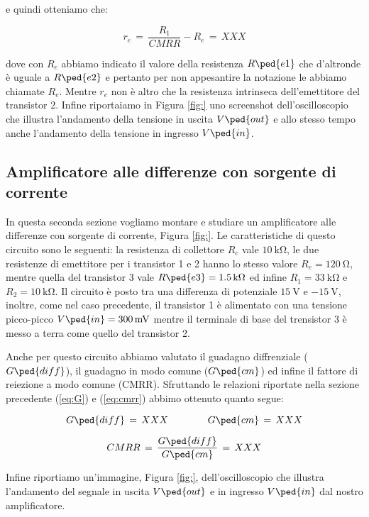 e quindi otteniamo che:

\begin{equation}
	r_e\,=\,\frac{R_1}{CMRR}-R_e\,=\, XXX
\end{equation}

dove con $R_e$ abbiamo indicato il valore della resistenza $R\ped{e1}$ che d'altronde è uguale a $R\ped{e2}$ e pertanto per non appesantire la notazione le abbiamo chiamate $R_e$. Mentre $r_e$ non è altro che la resistenza intrinseca dell'emettitore del transistor 2.
Infine riportaiamo in Figura \ref{fig:} uno screenshot dell'oscilloscopio che illustra l'andamento della tensione in uscita $V\ped{out}$ e allo stesso tempo anche l'andamento della tensione in ingresso $V\ped{in}$.

\subsection*{Amplificatore alle differenze con sorgente di corrente}

In questa seconda sezione vogliamo montare e studiare un amplificatore alle differenze con sorgente di corrente, Figura \ref{fig:}.
Le caratteristiche di questo circuito sono le seguenti: la resistenza di collettore $R_c$ vale $\SI{10}{\kilo\ohm}$, le due resistenze di emettitore per i transistor 1 e 2 hanno lo stesso valore $R_e = \SI{120}{\ohm}$, mentre quella del transistor 3 vale $R\ped{e3} = \SI{1.5}{\kilo\ohm}$ ed infine $R_1 = \SI{33}{\kilo\ohm}$ e $R_2 = \SI{10}{\kilo\ohm}$.
Il circuito è posto tra una differenza di potenziale $\SI{+15}{\volt}$ e $\SI{-15}{\volt}$, inoltre, come nel caso precedente, il transistor 1 è alimentato con una tensione picco-picco $V\ped{in} = \SI{300}{\milli\volt}$ mentre il terminale di base del trensistor 3 è messo a terra come quello del transistor 2.

Anche per questo circuito abbiamo valutato il guadagno diffrenziale ($G\ped{diff}$), il guadagno in modo comune ($G\ped{cm}$) ed infine il fattore di reiezione a modo comune (CMRR). Sfruttando le relazioni riportate nella sezione precedente (\ref{eq:G}) e (\ref{eq:cmrr}) abbimo ottenuto quanto segue:

\begin{equation}
	G\ped{diff}\,=\, XXX \qquad\qquad G\ped{cm}\,=\, XXX
\end{equation}

\begin{equation}
	CMRR\,=\,\frac{G\ped{diff}}{G\ped{cm}}\,=\, XXX
\end{equation}

Infine riportiamo un'immagine, Figura \ref{fig:}, dell'oscilloscopio che illustra l'andamento del segnale in uscita $V\ped{out}$ e in ingresso $V\ped{in}$ dal nostro amplificatore.












